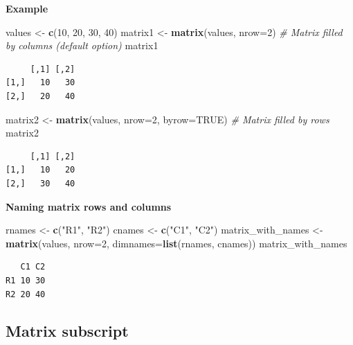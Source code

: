 \documentclass[
]{book}
\newenvironment{Shaded}{\begin{snugshade}}{\end{snugshade}}
\newcommand{\CommentTok}[1]{\textcolor[rgb]{0.56,0.35,0.01}{\textit{#1}}}
\newcommand{\DataTypeTok}[1]{\textcolor[rgb]{0.13,0.29,0.53}{#1}}
\newcommand{\DecValTok}[1]{\textcolor[rgb]{0.00,0.00,0.81}{#1}}
\newcommand{\KeywordTok}[1]{\textcolor[rgb]{0.13,0.29,0.53}{\textbf{#1}}}
\newcommand{\NormalTok}[1]{#1}
\newcommand{\OtherTok}[1]{\textcolor[rgb]{0.56,0.35,0.01}{#1}}
\newcommand{\StringTok}[1]{\textcolor[rgb]{0.31,0.60,0.02}{#1}}
\begin{document}
\textbf{Example}

\begin{Shaded}
\begin{Highlighting}[]
\NormalTok{values <-}\StringTok{ }\KeywordTok{c}\NormalTok{(}\DecValTok{10}\NormalTok{, }\DecValTok{20}\NormalTok{, }\DecValTok{30}\NormalTok{, }\DecValTok{40}\NormalTok{)}
\NormalTok{matrix1 <-}\StringTok{ }\KeywordTok{matrix}\NormalTok{(values, }\DataTypeTok{nrow=}\DecValTok{2}\NormalTok{) }\CommentTok{# Matrix filled by columns (default option)}
\NormalTok{matrix1}
\end{Highlighting}
\end{Shaded}

\begin{verbatim}
     [,1] [,2]
[1,]   10   30
[2,]   20   40
\end{verbatim}

\begin{Shaded}
\begin{Highlighting}[]
\NormalTok{matrix2 <-}\StringTok{ }\KeywordTok{matrix}\NormalTok{(values, }\DataTypeTok{nrow=}\DecValTok{2}\NormalTok{, }\DataTypeTok{byrow=}\OtherTok{TRUE}\NormalTok{) }\CommentTok{# Matrix filled by rows}
\NormalTok{matrix2}
\end{Highlighting}
\end{Shaded}

\begin{verbatim}
     [,1] [,2]
[1,]   10   20
[2,]   30   40
\end{verbatim}

\textbf{Naming matrix rows and columns}

\begin{Shaded}
\begin{Highlighting}[]
\NormalTok{rnames <-}\StringTok{ }\KeywordTok{c}\NormalTok{(}\StringTok{"R1"}\NormalTok{, }\StringTok{"R2"}\NormalTok{)}
\NormalTok{cnames <-}\StringTok{ }\KeywordTok{c}\NormalTok{(}\StringTok{"C1"}\NormalTok{, }\StringTok{"C2"}\NormalTok{)}
\NormalTok{matrix_with_names <-}\StringTok{ }\KeywordTok{matrix}\NormalTok{(values, }\DataTypeTok{nrow=}\DecValTok{2}\NormalTok{, }\DataTypeTok{dimnames=}\KeywordTok{list}\NormalTok{(rnames, cnames))}
\NormalTok{matrix_with_names}
\end{Highlighting}
\end{Shaded}

\begin{verbatim}
   C1 C2
R1 10 30
R2 20 40
\end{verbatim}

\hypertarget{matrix-subscript}{%
\subsection{Matrix subscript}\label{matrix-subscript}}
\end{document}
